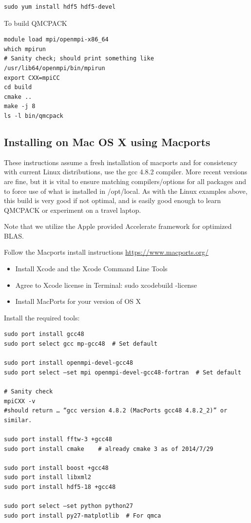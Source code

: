 \begin{verbatim}
sudo yum install hdf5 hdf5-devel 
\end{verbatim}

To build QMCPACK
\begin{verbatim}
module load mpi/openmpi-x86_64
which mpirun
# Sanity check; should print something like   /usr/lib64/openmpi/bin/mpirun
export CXX=mpiCC
cd build
cmake ..
make -j 8  
ls -l bin/qmcpack
\end{verbatim}

\subsection{Installing on Mac OS X using Macports}
These instructions assume a fresh installation of macports
and for consistency with current Linux distributions, use the gcc 4.8.2
compiler. More recent versions are fine, but it is vital to ensure matching compilers/options for all
packages and to force use of what is installed in /opt/local. As with
the Linux examples above, this build is very good if not optimal, and
is easily good enough to learn QMCPACK or experiment on a travel laptop.

Note that we utilize the Apple provided Accelerate framework for optimized BLAS.

Follow the Macports install instructions \url{https://www.macports.org/}

\begin{itemize}
\item Install Xcode and the Xcode Command Line Tools
\item Agree to Xcode license in Terminal: sudo xcodebuild -license
\item Install MacPorts for your version of OS X
\end{itemize}


Install the required tools:

\begin{verbatim} 
sudo port install gcc48
sudo port select gcc mp-gcc48  # Set default

sudo port install openmpi-devel-gcc48
sudo port select —set mpi openmpi-devel-gcc48-fortran  # Set default

# Sanity check
mpiCXX -v 
#should return … “gcc version 4.8.2 (MacPorts gcc48 4.8.2_2)” or similar.

sudo port install fftw-3 +gcc48
sudo port install cmake    # already cmake 3 as of 2014/7/29

sudo port install boost +gcc48
sudo port install libxml2
sudo port install hdf5-18 +gcc48

sudo port select —set python python27
sudo port install py27-matplotlib  # For qmca
\end{verbatim}

